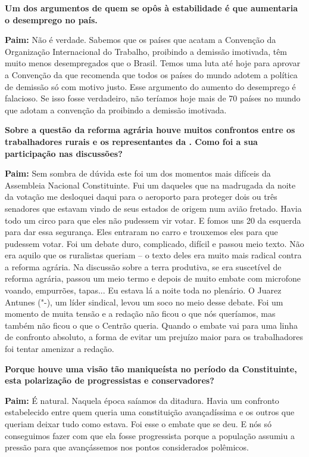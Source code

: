 \textbf{Um dos argumentos de quem se opôs à estabilidade é que
aumentaria o desemprego no país.}

\textbf{Paim:} Não é verdade. Sabemos que os países que acatam a
Convenção da Organização Internacional do Trabalho, proibindo a demissão
imotivada, têm muito menos desempregados que o Brasil. Temos uma luta
até hoje para aprovar a Convenção da  que recomenda que todos os
países do mundo adotem a política de demissão só com motivo justo. Esse
argumento do aumento do desemprego é falacioso. Se isso fosse
verdadeiro, não teríamos hoje mais de 70 países no mundo que adotam a
convenção da  proibindo a demissão imotivada.

\textbf{Sobre a questão da reforma agrária houve muitos confrontos entre
os trabalhadores rurais e os representantes da . Como foi a sua
participação nas discussões?}

\textbf{Paim:} Sem sombra de dúvida este foi um dos momentos mais
difíceis da Assembleia Nacional Constituinte. Fui um daqueles que na
madrugada da noite da votação me desloquei daqui para o aeroporto para
proteger dois ou três senadores que estavam vindo de seus estados de
origem num avião fretado. Havia todo um circo para que eles não pudessem
vir votar. E fomos uns 20 da esquerda para dar essa segurança. Eles
entraram no carro e trouxemos eles para que pudessem votar. Foi um
debate duro, complicado, difícil e passou meio texto. Não era aquilo que
os ruralistas queriam -- o texto deles era muito mais radical contra a
reforma agrária. Na discussão sobre a terra produtiva, se era suscetível
de reforma agrária, passou um meio termo e depois de muito embate com
microfone voando, empurrões, tapas... Eu estava lá a noite toda no
plenário. O Juarez Antunes ("-), um líder sindical, levou um soco no
meio desse debate. Foi um momento de muita tensão e a redação não ficou
o que nós queríamos, mas também não ficou o que o Centrão queria. Quando
o embate vai para uma linha de confronto absoluto, a forma de evitar um
prejuízo maior para os trabalhadores foi tentar amenizar a redação.

\textbf{Porque houve uma visão tão maniqueísta no período da
Constituinte, esta polarização de progressistas e conservadores?}

\textbf{Paim:} É natural. Naquela época saíamos da ditadura. Havia um
confronto estabelecido entre quem queria uma constituição avançadíssima
e os outros que queriam deixar tudo como estava. Foi esse o embate que
se deu. E nós só conseguimos fazer com que ela fosse progressista porque
a população assumiu a pressão para que avançássemos nos pontos
considerados polêmicos.

